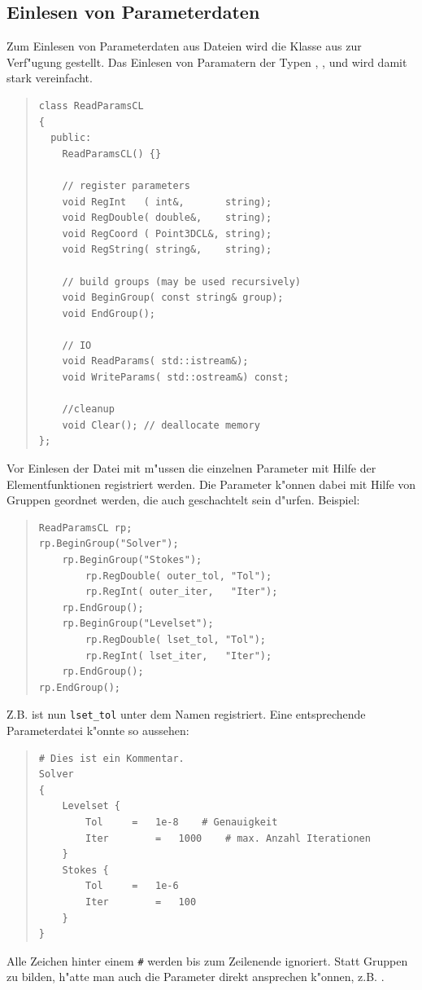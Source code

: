 \documentclass[11pt,a4paper]{article}
\newenvironment{Code}{\begin{quote}\scriptsize}{\end{quote}}
\begin{document}
\subsection{Einlesen von Parameterdaten}
Zum Einlesen von Parameterdaten aus Dateien wird die Klasse 
aus 
zur Verf"ugung gestellt. Das Einlesen von Paramatern der Typen , 
,  und  wird damit stark vereinfacht.
\begin{Code}
\begin{verbatim}
class ReadParamsCL
{
  public:
    ReadParamsCL() {}
    
    // register parameters
    void RegInt   ( int&,       string);
    void RegDouble( double&,    string);
    void RegCoord ( Point3DCL&, string);
    void RegString( string&,    string);
    
    // build groups (may be used recursively)
    void BeginGroup( const string& group);
    void EndGroup();
    
    // IO
    void ReadParams( std::istream&);
    void WriteParams( std::ostream&) const;
    
    //cleanup
    void Clear(); // deallocate memory
};
\end{verbatim}
\end{Code}
Vor Einlesen der Datei mit  m"ussen die einzelnen Parameter
mit Hilfe der Elementfunktionen  registriert werden. Die Parameter
k"onnen dabei mit Hilfe von Gruppen geordnet werden, die auch geschachtelt sein
d"urfen. Beispiel:
\begin{Code}
\begin{verbatim}
ReadParamsCL rp;
rp.BeginGroup("Solver");
    rp.BeginGroup("Stokes");
        rp.RegDouble( outer_tol, "Tol");
        rp.RegInt( outer_iter,   "Iter");
    rp.EndGroup();
    rp.BeginGroup("Levelset");
        rp.RegDouble( lset_tol, "Tol");
        rp.RegInt( lset_iter,   "Iter");
    rp.EndGroup();
rp.EndGroup();
\end{verbatim}
\end{Code}
Z.B. ist nun \verb|lset_tol| unter dem Namen  
registriert. Eine entsprechende Parameterdatei k"onnte so aussehen:
\begin{Code}
\begin{verbatim}
# Dies ist ein Kommentar.
Solver
{
    Levelset {
        Tol		=	1e-8	# Genauigkeit
        Iter		=	1000	# max. Anzahl Iterationen
    }
    Stokes {
        Tol		=	1e-6
        Iter		=	100
    }
}
\end{verbatim}
\end{Code}
Alle Zeichen hinter einem \verb|#| werden bis zum Zeilenende ignoriert.
Statt Gruppen zu bilden, h"atte man auch die Parameter direkt ansprechen k"onnen,
z.B. .
\end{document}
